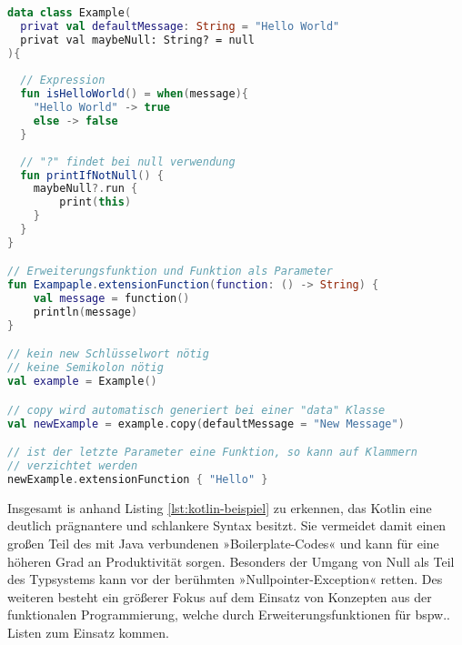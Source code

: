 \begin{lstlisting}[caption={Kotlin Beispiel}, label={lst:kotlin-beispiel}, language=Kotlin]
data class Example(
  privat val defaultMessage: String = "Hello World"
  privat val maybeNull: String? = null
){
  
  // Expression
  fun isHelloWorld() = when(message){
    "Hello World" -> true
    else -> false
  }
  
  // "?" findet bei null verwendung
  fun printIfNotNull() {
    maybeNull?.run { 
    	print(this)
    }
  }
}

// Erweiterungsfunktion und Funktion als Parameter
fun Exampaple.extensionFunction(function: () -> String) { 
	val message = function()
	println(message)
}

// kein new Schlüsselwort nötig
// keine Semikolon nötig
val example = Example()

// copy wird automatisch generiert bei einer "data" Klasse
val newExample = example.copy(defaultMessage = "New Message")

// ist der letzte Parameter eine Funktion, so kann auf Klammern 
// verzichtet werden
newExample.extensionFunction { "Hello" }
\end{lstlisting}
\bigskip
Insgesamt is anhand Listing
\ref{lst:kotlin-beispiel}
zu erkennen, das Kotlin eine deutlich prägnantere und schlankere Syntax besitzt. Sie vermeidet damit einen großen Teil des mit Java verbundenen »Boilerplate-Codes« und kann für eine höheren Grad an Produktivität sorgen. Besonders der Umgang von Null als Teil des Typsystems kann vor der berühmten »Nullpointer-Exception« retten. Des weiteren besteht ein größerer Fokus auf dem Einsatz von Konzepten aus der funktionalen Programmierung, welche durch Erweiterungsfunktionen für bspw.. Listen zum Einsatz kommen.

